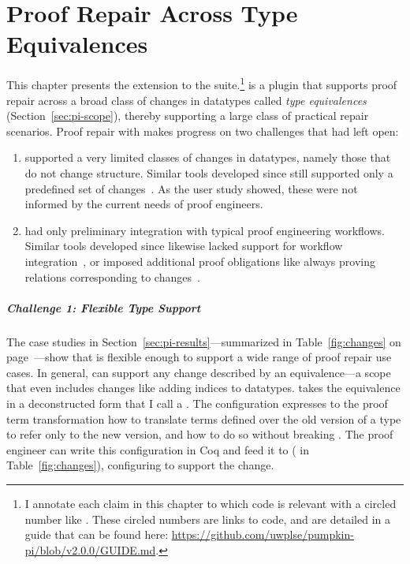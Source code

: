 \chapter{Proof Repair Across Type Equivalences}
\label{chapt:pi}


This chapter presents the \intro{\toolnamec} extension to the    suite.\footnote{I annotate each claim in this chapter to which code is relevant with a circled number like . These circled numbers are links to code, and are detailed in a guide that can be found here: \url{https://github.com/uwplse/pumpkin-pi/blob/v2.0.0/GUIDE.md}.}
\toolnamec is a plugin that supports proof repair across a broad class of changes in datatypes called 
\textit{type equivalences} (Section~\ref{sec:pi-scope}),
thereby supporting a large class of practical repair scenarios.
Proof repair  with \toolnamec makes progress on two challenges that  had left open:

\begin{enumerate}
\item \sysname supported a very limited classes of changes in datatypes, namely those that do not change structure.
Similar tools developed since still supported only a predefined set of changes~\cite{robert2018, wibergh2019}.
As the  user study showed, these were not informed by the current needs of proof engineers. %
\item \sysname had only preliminary integration with typical proof engineering workflows.
Similar tools developed since likewise lacked support for workflow integration~\cite{PGL-045, robert2018},
or imposed additional proof obligations like always proving relations corresponding to changes~\cite{tabareau2019marriage}.
\end{enumerate}

\paragraph{Challenge 1: Flexible Type Support}
The case studies in Section~\ref{sec:pi-results}---summarized in Table~\ref{fig:changes} on page~\pageref{fig:changes}---show that \toolnamec is flexible enough to support
a wide range of proof repair use cases. %
In general, \toolnamec can support any change described by an equivalence---a scope that even includes changes like adding indices to datatypes.
\toolnamec takes the equivalence in a deconstructed form that I call a .
The configuration expresses to the proof term transformation how to translate terms defined over the old version of a type
to refer only to the new version, and how to do so without breaking .
The proof engineer can write this configuration in Coq and feed it to \toolnamec ( in Table~\ref{fig:changes}),
configuring \toolnamec to support the change. %

